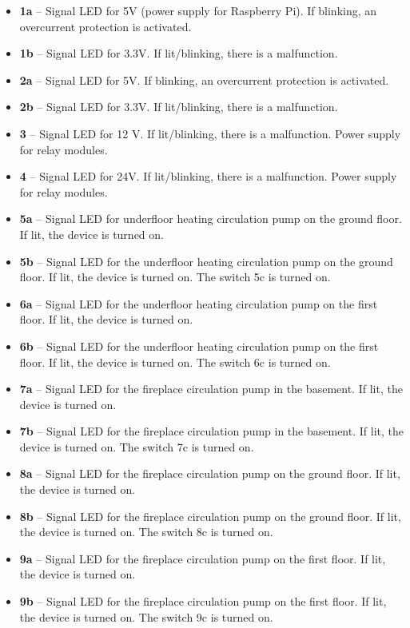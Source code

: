 \begin{English}
\begin{itemize}
  \item \textbf{1a} – Signal LED for 5V (power supply for Raspberry Pi). If blinking, an overcurrent protection is activated.
  \item \textbf{1b} – Signal LED for 3.3V. If lit/blinking, there is a malfunction.
  \item \textbf{2a} – Signal LED for 5V. If blinking, an overcurrent protection is activated.
  \item \textbf{2b} – Signal LED for 3.3V. If lit/blinking, there is a malfunction.
  \item \textbf{3} – Signal LED for 12 V. If lit/blinking, there is a malfunction. Power supply for relay modules.
  \item \textbf{4} – Signal LED for 24V. If lit/blinking, there is a malfunction. Power supply for relay modules.
  \item \textbf{5a} – Signal LED for underfloor heating circulation pump on the ground floor. If lit, the device is turned on.
    \item \textbf{5b} – Signal LED for the underfloor heating circulation pump on the ground floor. If lit, the device is turned on. The switch 5c is turned on.
  \item \textbf{6a} – Signal LED for the underfloor heating circulation pump on the first floor. If lit, the device is turned on.
    \item \textbf{6b} – Signal LED for the underfloor heating circulation pump on the first floor. If lit, the device is turned on. The switch 6c is turned on.
  \item \textbf{7a} – Signal LED for the fireplace circulation pump in the basement. If lit, the device is turned on.
    \item \textbf{7b} – Signal LED for the fireplace circulation pump in the basement. If lit, the device is turned on. The switch 7c is turned on.
  \item \textbf{8a} – Signal LED for the fireplace circulation pump on the ground floor. If lit, the device is turned on.
    \item \textbf{8b} – Signal LED for the fireplace circulation pump on the ground floor. If lit, the device is turned on. The switch 8c is turned on.
  \item \textbf{9a} – Signal LED for the fireplace circulation pump on the first floor. If lit, the device is turned on.
    \item \textbf{9b} – Signal LED for the fireplace circulation pump on the first floor. If lit, the device is turned on. The switch 9c is turned on.

\end{itemize}
\end{English}
